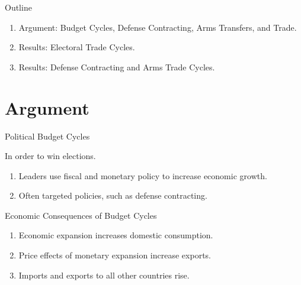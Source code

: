 \documentclass[12pt]{beamer}
\begin{document}

\begin{frame}{Outline}

\pause
\begin{enumerate}
\item Argument: Budget Cycles, Defense Contracting, Arms Transfers, and Trade. 
\pause
\item Results: Electoral Trade Cycles. 
\pause
\item Results: Defense Contracting and Arms Trade Cycles.  
\end{enumerate}


\end{frame}
 


\section{Argument} 


\begin{frame}{Political Budget Cycles}

In order to win elections. 
\pause 
\begin{enumerate} 
\item Leaders use fiscal and monetary policy to increase economic growth. 
\pause 
\item Often targeted policies, such as defense contracting.
\end{enumerate}


\end{frame} 


\begin{frame}{Economic Consequences of Budget Cycles}

\pause 
\begin{enumerate} 
\item Economic expansion increases domestic consumption.  
\pause 
\item Price effects of monetary expansion increase exports.
\pause
\item Imports and exports to all other countries rise. 
\end{enumerate}


\end{frame} 

\end{document}
